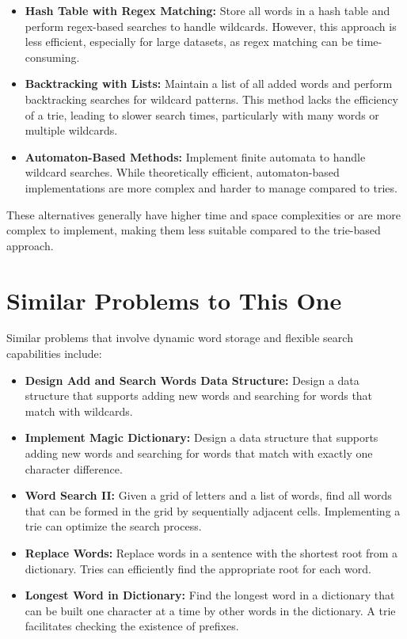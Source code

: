 \begin{itemize}
    \item \textbf{Hash Table with Regex Matching:}  
    Store all words in a hash table and perform regex-based searches to handle wildcards. However, this approach is less efficient, especially for large datasets, as regex matching can be time-consuming.
    
    \item \textbf{Backtracking with Lists:}  
    Maintain a list of all added words and perform backtracking searches for wildcard patterns. This method lacks the efficiency of a trie, leading to slower search times, particularly with many words or multiple wildcards.
    
    \item \textbf{Automaton-Based Methods:}  
    Implement finite automata to handle wildcard searches. While theoretically efficient, automaton-based implementations are more complex and harder to manage compared to tries.
\end{itemize}

These alternatives generally have higher time and space complexities or are more complex to implement, making them less suitable compared to the trie-based approach.

\section*{Similar Problems to This One}

Similar problems that involve dynamic word storage and flexible search capabilities include:

\begin{itemize}
    \item \textbf{Design Add and Search Words Data Structure:}  
    Design a data structure that supports adding new words and searching for words that match with wildcards.
    
    \item \textbf{Implement Magic Dictionary:}  
    Design a data structure that supports adding new words and searching for words that match with exactly one character difference.
    
    \item \textbf{Word Search II:}  
    Given a grid of letters and a list of words, find all words that can be formed in the grid by sequentially adjacent cells. Implementing a trie can optimize the search process.
    
    \item \textbf{Replace Words:}  
    Replace words in a sentence with the shortest root from a dictionary. Tries can efficiently find the appropriate root for each word.
    
    \item \textbf{Longest Word in Dictionary:}  
    Find the longest word in a dictionary that can be built one character at a time by other words in the dictionary. A trie facilitates checking the existence of prefixes.
\end{itemize}


